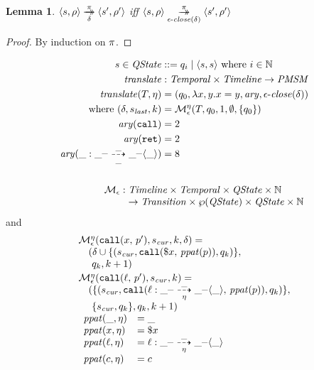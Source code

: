 \documentclass[preprint,onecolumn,9pt]{sigplanconf} %
\newtheorem{lemma}{Lemma}
\begin{document}
\begin{lemma}
  $\langle s, \rho \rangle \overset{\pi}{\underset{\delta}{\to\!\!\!\!\!\to}} \langle s', \rho' \rangle$ iff
  $\langle s, \rho \rangle \overset{\pi}{\underset{\epsilon\text{-}\mathit{close}(\delta)}{\to\!\!\!\!\!\to}} \langle s', \rho' \rangle$
\end{lemma}
\begin{proof}
  By induction on $\pi$.
\end{proof}
%
\begin{align*}
 s \in \QState &::= q_i \alt \pmsmpair{s}{s} \text{ where } i \in \Nat
\\
 \translateeps &: \TContract \times \Timeline \to \PMSM
\\
 \translateeps(\mtcon, \mtimeline) &= (\pmsmq_0, \lambda x,y . x = y, \ary, \epsclose(\delta)) \\
 \text{where }
   (\delta, \pmsmqlast, k) &= \epshelp^\mtimeline(\mtcon, \pmsmq_0, 1, \emptyset, \setof{\pmsmq_0})
\\
   \ary(\apvcallalone) &= 2 \\
   \ary(\apvretalone) &= 2 \\
   \ary(\bclos{\swc}{\swc}{\swc}{\swc}{\swc}{\swc}{\swc}{\swc}) &= 8 \\
\\
\begin{array}{l}
    \epshelp :  \Timeline \times \TContract \times \QState \times \Nat \\ \phantom{\epshelp :}\to \mathit{Transition} \times \wp(\QState) \times \QState \times \Nat
\end{array}\span\omit
\end{align*}
and
\begin{align*}
\begin{array}{l}
  \epshelp^\mtimeline(\scallev{\mvar}{\mvpat'}, \pmsmqcur, k, \delta) = \\
\quad           (\delta
            \cup \setof{(\pmsmqcur,
                         \apvcall{\sref{\mvar}}{\vpatToPattern(\mvpat)},
                         \pmsmq_k)}, \\
\quad            \ \pmsmq_k, k+1)
\\[2pt]
%
  \epshelp^\mtimeline(\scallev{\mtoplevelname}{\mvpat'}, \pmsmqcur, k) = \\
\quad           (\setof{(\pmsmqcur,
                         \apvcall{\bclos{\mtoplevelname}{\swc}{\swc}{\swc}{\mtimeline}{\swc}{\swc}{\swc}}{\vpatToPattern(\mvpat)},
                         \pmsmq_k)}, \\
\quad            \ \setof{\pmsmqcur, \pmsmq_k}, \pmsmq_k, k+1)
\\
\begin{array}{ll}
  \vpatToPattern(\swc, \mtimeline) &= \swc
\\
  \vpatToPattern(\mvar, \mtimeline) &= \sref{\mvar}
\\
  \vpatToPattern(\mtoplevelname, \mtimeline) &= \bclos{\mtoplevelname}{\swc}{\swc}{\swc}{\mtimeline}{\swc}{\swc}{\swc} \\
  \vpatToPattern(\mconstant, \mtimeline) &= \mconstant
\end{array}
\end{array}
\end{align*}
\end{document}
